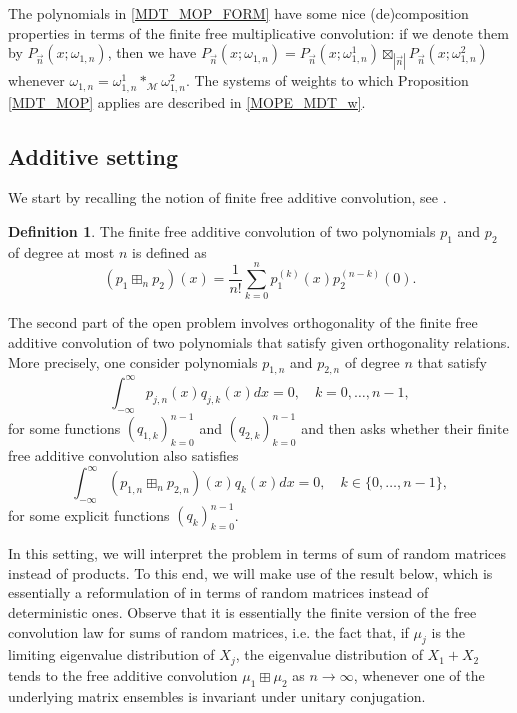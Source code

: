 \documentclass[a4paper,12pt,oneside]{article}
\theoremstyle{definition}
\newtheorem{defi}{Definition}[section]
\newcommand{\om}{\omega}
\newcommand{\sz}[1]{\left| \vec{#1} \right|}
\newcommand{\MT}[1]{\mathcal{M}#1}
\begin{document}
The polynomials in \eqref{MDT_MOP_FORM} have some nice (de)composition properties in terms of the finite free multiplicative convolution: if we denote them by $P_{\vec{n}}(x;\om_{1,n})$, then we have $P_{\vec{n}}(x;\om_{1,n}) = P_{\vec{n}}(x;\om_{1,n}^1) \boxtimes_{\sz{n}} P_{\vec{n}}(x;\om_{1,n}^2)$ whenever $\om_{1,n}=\om_{1,n}^1\ast_{\MT{}}\om_{1,n}^2$. The systems of weights to which Proposition \ref{MDT_MOP} applies are described in \eqref{MOPE_MDT_w}.

\subsection{Additive setting}

We start by recalling the notion of finite free additive convolution, see \cite[Def.~1.1]{MSS:fin_free_conv}.

\begin{defi}
    The finite free additive convolution of two polynomials $p_1$ and $p_2$ of degree at most $n$ is defined as
        $$ (p_1 \boxplus_n p_2)(x) = \frac{1}{n!} \sum_{k=0}^n p_1^{(k)}(x) p_2^{(n-k)}(0) . $$
\end{defi}

The second part of the open problem involves orthogonality of the finite free additive convolution of two polynomials that satisfy given orthogonality relations. More precisely, one consider polynomials $p_{1,n}$ and $p_{2,n}$ of degree $n$ that satisfy
    $$\int_{-\infty}^\infty p_{j,n}(x) q_{j,k}(x) dx = 0,\quad k=0,\dots,n-1,$$
for some functions $(q_{1,k})_{k=0}^{n-1}$ and $(q_{2,k})_{k=0}^{n-1}$ and then asks whether their finite free additive convolution also satisfies
    $$\int_{-\infty}^\infty (p_{1,n}\boxplus_n p_{2,n})(x) q_k(x) dx = 0,\quad k\in\{0,\dots,n-1\},$$
for some explicit functions $(q_k)_{k=0}^{n-1}$.
\medbreak

In this setting, we will interpret the problem in terms of sum of random matrices instead of products. To this end, we will make use of the result below, which is essentially a reformulation of \cite[Thm. 1.2]{MSS:fin_free_conv} in terms of random matrices instead of deterministic ones. Observe that it is essentially the finite version of the free convolution law for sums of random matrices, i.e. the fact that, if $\mu_j$ is the limiting eigenvalue distribution of $X_j$, the eigenvalue distribution of $X_1+X_2$ tends to the free additive convolution $\mu_1\boxplus\mu_2$ as $n\to\infty$, whenever one of the underlying matrix ensembles is invariant under unitary conjugation.
\end{document}
